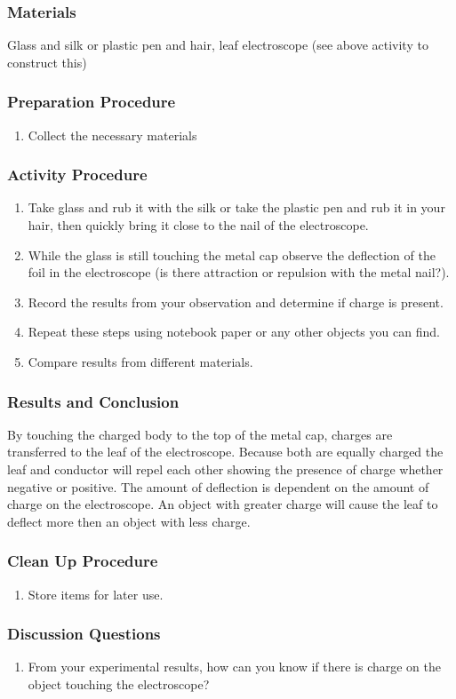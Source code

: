 \subsubsection*{Materials}
Glass and silk or plastic pen and hair, leaf electroscope (see above activity to construct this)

\subsubsection*{Preparation Procedure}
\begin{enumerate}
\item{Collect the necessary materials}
\end{enumerate}

\subsubsection*{Activity Procedure}
\begin{enumerate}
\item{Take glass and rub it with the silk or take the plastic pen and rub it in your hair, then quickly bring it close to the nail of the electroscope.}
\item{While the glass is still touching the metal cap observe the deflection of the foil in the electroscope  (is there attraction or repulsion with the metal nail?).} 
\item{Record the results from your observation and determine if charge is present.} 
\item{Repeat these steps using notebook paper or any other objects you can find.} 
\item{Compare results from different materials.}
\end{enumerate}

\subsubsection*{Results and Conclusion}
By touching the charged body to the top of the metal cap, charges are transferred to the leaf of the electroscope. Because both are equally charged the leaf and conductor will repel each other showing the presence of charge whether negative or positive.
The amount of deflection is dependent on the amount of charge on the electroscope. An object with greater charge will cause the leaf to deflect more then an object with less charge. 

\subsubsection*{Clean Up Procedure}
\begin{enumerate}
\item{Store items for later use.} 
\end{enumerate}

\subsubsection*{Discussion Questions}
\begin{enumerate}
\item{From your experimental results, how can you know if there is charge on the object touching the electroscope?} 
\end{enumerate}



